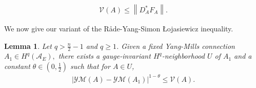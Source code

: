 \documentclass[12pt]{amsart}
\renewcommand{\1}{{\mathbf 1}}
\newcommand{\calA}{\mathcal{A}}
\newtheorem{lemma}[thm]{Lemma}
\theoremstyle{others}
\numberwithin{equation}{section}
\begin{document}
\begin{align*}
    \mathcal{V}(A) \leq \left\|D_A^\ast F_A\right\|.
\end{align*}\par
We now give our variant of the R{\aa}de-Yang-Simon {\L}ojasiewicz inequality.
\begin{lemma}\label{lemma:lojasiewicz}
Let \(q > \frac{n}{2}-1\) and \(q \geq 1\). Given a fixed Yang-Mills connection $A_1 \in H^q(\calA_E),$ there exists a gauge-invariant $H^q$-neighborhood \(U\) of \(A_1\) and a constant \(\theta \in \left(0, \frac{1}{2}\right)\) 
such that for \(A \in U\),
\begin{align}\label{lojasiewicz:lojasiewiczinequality}
    \left|\mathcal{YM}(A) - \mathcal{YM}(A_1)\right|^{1 - \theta} \leq \mathcal{V}(A).
\end{align}
\end{lemma}
\end{document}
